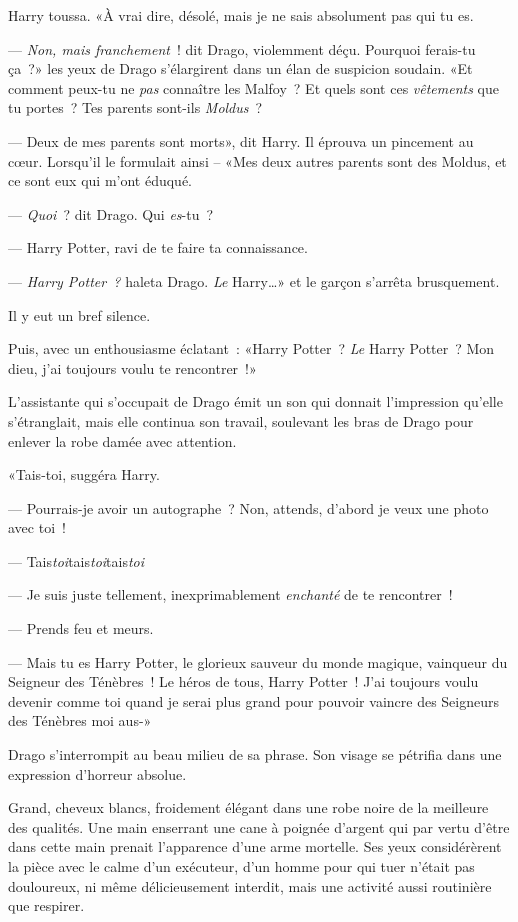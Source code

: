 Harry toussa.
«À vrai dire, désolé, mais je ne sais absolument pas qui tu es.

--- \emph{Non, mais franchement}~! dit Drago, violemment déçu. Pourquoi ferais-tu ça~?» les yeux de Drago s'élargirent dans un élan de suspicion soudain. «Et comment peux-tu ne \emph{pas} connaître les Malfoy~? Et quels sont ces \emph{vêtements} que tu portes~? Tes parents sont-ils \emph{Moldus}~?

--- Deux de mes parents sont morts», dit Harry. Il éprouva un pincement au cœur. Lorsqu'il le formulait ainsi -- «Mes deux autres parents sont des Moldus, et ce sont eux qui m'ont éduqué.

--- \emph{Quoi}~? dit Drago. Qui \emph{es}-tu~?

--- Harry Potter, ravi de te faire ta connaissance.

--- \emph{Harry Potter~?} haleta Drago. \emph{Le} Harry…» et le garçon s'arrêta brusquement.

Il y eut un bref silence.

Puis, avec un enthousiasme éclatant~: «Harry Potter~? \emph{Le} Harry Potter~? Mon dieu, j'ai toujours voulu te rencontrer~!»

L'assistante qui s'occupait de Drago émit un son qui donnait l'impression qu'elle s'étranglait, mais elle continua son travail, soulevant les bras de Drago pour enlever la robe damée avec attention.

«Tais-toi, suggéra Harry.

--- Pourrais-je avoir un autographe~? Non, attends, d'abord je veux une photo avec toi~!

--- Tais\emph{toi}tais\emph{toi}tais\emph{toi}

--- Je suis juste tellement, inexprimablement \emph{enchanté} de te rencontrer~!

--- Prends feu et meurs.

--- Mais tu es Harry Potter, le glorieux sauveur du monde magique, vainqueur du Seigneur des Ténèbres~! Le héros de tous, Harry Potter~! J'ai toujours voulu devenir comme toi quand je serai plus grand pour pouvoir vaincre des Seigneurs des Ténèbres moi aus-»

Drago s'interrompit au beau milieu de sa phrase. Son visage se pétrifia dans une expression d'horreur absolue.

Grand, cheveux blancs, froidement élégant dans une robe noire de la meilleure des qualités. Une main enserrant une cane à poignée d'argent qui par vertu d'être dans cette main prenait l'apparence d'une arme mortelle. Ses yeux considérèrent la pièce avec le calme d'un exécuteur, d'un homme pour qui tuer n'était pas douloureux, ni même délicieusement interdit, mais une activité aussi routinière que respirer.

